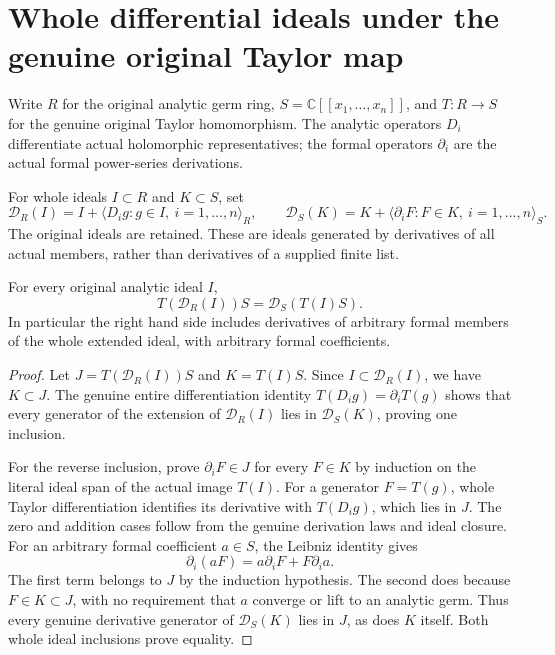 \section{Whole differential ideals under the genuine original Taylor map}

Write $R$ for the original analytic germ ring, $S=\mathbb C[[x_1,\ldots,x_n]]$,
and $T:R\to S$ for the genuine original Taylor homomorphism. The analytic
operators $D_i$ differentiate actual holomorphic representatives; the formal
operators $\partial_i$ are the actual formal power-series derivations.

\begin{definition}
\label{hir:actual-original-differential-ideal-definition}
\leanok
For whole ideals $I\subset R$ and $K\subset S$, set
\[
 \mathcal D_R(I)=I+\langle D_i g:g\in I,\ i=1,\ldots,n\rangle_R,
 \qquad
 \mathcal D_S(K)=K+\langle\partial_iF:F\in K,\ i=1,\ldots,n\rangle_S.
\]
The original ideals are retained. These are ideals generated by derivatives
of all actual members, rather than derivatives of a supplied finite list.
\end{definition}

\begin{theorem}
\label{hir:actual-original-whole-differential-ideal-extension}
\leanok
For every original analytic ideal $I$,
\[
 T(\mathcal D_R(I))S=\mathcal D_S(T(I)S).
\]
In particular the right hand side includes derivatives of arbitrary formal
members of the whole extended ideal, with arbitrary formal coefficients.
\end{theorem}
\begin{proof}
Let $J=T(\mathcal D_R(I))S$ and $K=T(I)S$. Since $I\subset\mathcal D_R(I)$,
we have $K\subset J$. The genuine entire differentiation identity
$T(D_i g)=\partial_iT(g)$ shows that every generator of the extension of
$\mathcal D_R(I)$ lies in $\mathcal D_S(K)$, proving one inclusion.

For the reverse inclusion, prove $\partial_iF\in J$ for every $F\in K$
by induction on the literal ideal span of the actual image $T(I)$.
For a generator $F=T(g)$, whole Taylor differentiation identifies its
derivative with $T(D_i g)$, which lies in $J$. The zero and addition cases
follow from the genuine derivation laws and ideal closure. For an arbitrary
formal coefficient $a\in S$, the Leibniz identity gives
\[
 \partial_i(aF)=a\partial_iF+F\partial_i a.
\]
The first term belongs to $J$ by the induction hypothesis. The second does
because $F\in K\subset J$, with no requirement that $a$ converge or lift to
an analytic germ. Thus every genuine derivative generator of $\mathcal D_S(K)$
lies in $J$, as does $K$ itself. Both whole ideal inclusions prove equality.
\end{proof}

